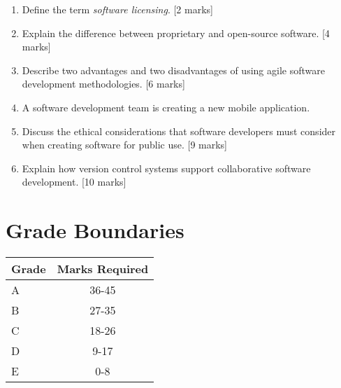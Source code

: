 \documentclass[a4paper,12pt]{article}
\begin{document}
\begin{enumerate}
\item Define the term \textit{software licensing}. [2 marks]

\item Explain the difference between proprietary and open-source software. [4 marks]

\item Describe two advantages and two disadvantages of using agile software development methodologies. [6 marks]

\item A software development team is creating a new mobile application. 

\item Discuss the ethical considerations that software developers must consider when creating software for public use. [9 marks]

\item Explain how version control systems support collaborative software development. [10 marks]
\end{enumerate}

\newpage

\section*{Grade Boundaries}
\begin{tabular}{|l|c|}
\hline
Grade & Marks Required \\
\hline
A & 36-45 \\
B & 27-35 \\
C & 18-26 \\
D & 9-17 \\
E & 0-8 \\
\hline
\end{tabular}
\end{document}
